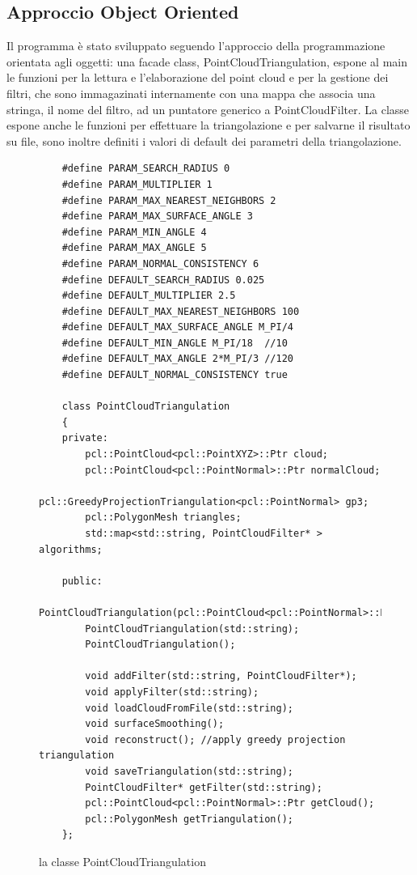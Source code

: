\documentclass[a4paper,12pt]{article}
\begin{document}
	\subsection{Approccio Object Oriented}
	Il programma è stato sviluppato seguendo l'approccio della programmazione orientata agli oggetti: 
	una facade class, PointCloudTriangulation, espone al main le funzioni per la lettura  e l'elaborazione del point cloud
	e per la gestione dei filtri, che sono immagazinati internamente con una mappa che associa una stringa, 
	il nome del filtro, ad un puntatore generico a PointCloudFilter.	
	La classe espone anche le funzioni per effettuare la triangolazione e per salvarne il risultato su file, sono
	inoltre definiti i valori di default dei parametri della triangolazione.
	\begin{figure}[H]	
	\begin{lstlisting}	
	#define PARAM_SEARCH_RADIUS 0
	#define PARAM_MULTIPLIER 1
	#define PARAM_MAX_NEAREST_NEIGHBORS 2
	#define PARAM_MAX_SURFACE_ANGLE 3
	#define PARAM_MIN_ANGLE 4
	#define PARAM_MAX_ANGLE 5
	#define PARAM_NORMAL_CONSISTENCY 6	
	#define DEFAULT_SEARCH_RADIUS 0.025
	#define DEFAULT_MULTIPLIER 2.5
	#define DEFAULT_MAX_NEAREST_NEIGHBORS 100
	#define DEFAULT_MAX_SURFACE_ANGLE M_PI/4 
	#define DEFAULT_MIN_ANGLE M_PI/18  //10
	#define DEFAULT_MAX_ANGLE 2*M_PI/3 //120
	#define DEFAULT_NORMAL_CONSISTENCY true
	
	class PointCloudTriangulation
	{
	private:
    	pcl::PointCloud<pcl::PointXYZ>::Ptr cloud;
    	pcl::PointCloud<pcl::PointNormal>::Ptr normalCloud;
    	pcl::GreedyProjectionTriangulation<pcl::PointNormal> gp3;
    	pcl::PolygonMesh triangles;
    	std::map<std::string, PointCloudFilter* > algorithms;
    
	public:
   		PointCloudTriangulation(pcl::PointCloud<pcl::PointNormal>::Ptr);
    	PointCloudTriangulation(std::string);
    	PointCloudTriangulation();

	    void addFilter(std::string, PointCloudFilter*);
    	void applyFilter(std::string);
    	void loadCloudFromFile(std::string);
    	void surfaceSmoothing();
    	void reconstruct(); //apply greedy projection triangulation
    	void saveTriangulation(std::string);
    	PointCloudFilter* getFilter(std::string);
    	pcl::PointCloud<pcl::PointNormal>::Ptr getCloud();
    	pcl::PolygonMesh getTriangulation();    
	};	
	\end{lstlisting}
	\label{fig:PointCloudTriangulation}
	\caption{la classe PointCloudTriangulation}
	\end{figure}
	\clearpage
	
\end{document}

